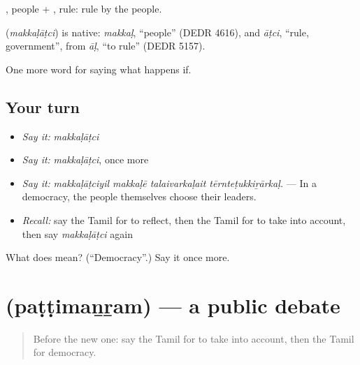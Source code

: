 , people + , rule: rule by the people.

\begin{cousinweb}
\textbf{} (\emph{makkaḷāṭci}) is native: \emph{makkaḷ}, \textquotedblleft{}people\textquotedblright{} (DEDR 4616), and \emph{āṭci}, \textquotedblleft{}rule, government\textquotedblright{}, from \emph{āḷ}, \textquotedblleft{}to rule\textquotedblright{} (DEDR 5157).
\end{cousinweb}

\begin{grammarlens}[title={What you've built}]
One more word for saying what happens if.
\end{grammarlens}

\subsection*{Your turn}
\begin{itemize}
\raggedright
  \item \emph{Say it:} \emph{makkaḷāṭci}
  \item \emph{Say it:} \emph{makkaḷāṭci}, once more
  \item \emph{Say it:} \emph{makkaḷāṭciyil makkaḷē talaivarkaḷait tērnteṭukkiṟārkaḷ.} — In a democracy, the people themselves choose their leaders.
  \item \emph{Recall:} say the Tamil for to reflect, then the Tamil for to take into account, then say \emph{makkaḷāṭci} again
\end{itemize}

\begin{tcolorbox}[breakable,colback=teal!4,colframe=teal!35!black,title={Before you move on}]
What does  mean? (\textquotedblleft{}Democracy\textquotedblright{}.) Say it once more.
\end{tcolorbox}
\section[\texorpdfstring{\ta{பட்டிமன்றம்} (paṭṭimaṉṟam)}{பட்டிமன்றம் (paṭṭimaṉṟam)}]{ (paṭṭimaṉṟam) — a public debate}

\label{lesson:TA-C397-pattimanram}



\begin{quote}
Before the new one: say the Tamil for to take into account, then the Tamil for democracy.
\end{quote}

